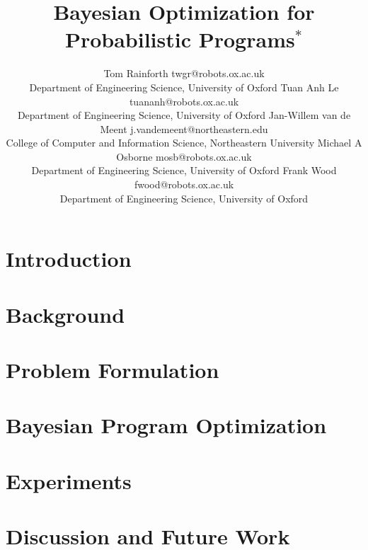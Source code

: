 \documentclass[]{article}
\title{Bayesian Optimization for Probabilistic Programs$^*$}
\author{\name Tom Rainforth \email twgr@robots.ox.ac.uk \\
	\addr Department of Engineering Science, University of Oxford
	\AND
	\name Tuan Anh Le \email tuananh@robots.ox.ac.uk \\
	\addr Department of Engineering Science, University of Oxford
	\AND
	\name Jan-Willem van de Meent \email j.vandemeent@northeastern.edu \\
	\addr College of Computer and Information Science, Northeastern University
	\AND
	\name Michael A Osborne \email mosb@robots.ox.ac.uk \\
	\addr Department of Engineering Science, University of Oxford
	\AND
	\name Frank Wood \email fwood@robots.ox.ac.uk \\
	\addr Department of Engineering Science, University of Oxford \\
}
\begin{document}
%
%

\maketitle
\vspace{-30pt}

\newcommand\blfootnote[1]{%
	\begingroup
	\renewcommand\thefootnote{}\footnote{#1}%
	\addtocounter{footnote}{-1}%
	\endgroup
}

\begin{abstract}

\end{abstract}

\thispagestyle{empty}


\section{Introduction} 
\label{sec:IntroductionBOPP}



\section{Background}






\section{Problem Formulation}
\label{sec:problem}



\section{Bayesian Program Optimization}
\label{sec:bopp}



\section{Experiments}



\section{Discussion and Future Work}
\label{sec:disc}
\end{document}
